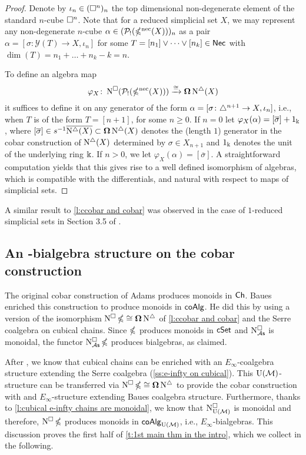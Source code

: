 \begin{proof}
	Denote by $\iota_n \in (\square^n)_n$ the top dimensional non-degenerate element of the standard $n$-cube $\square^n$.
	Note that for a reduced simplicial set $X$, we may represent any non-degenerate $n$-cube $\alpha \in (\mathcal{P}_!(\operatorname{\mathbb{\Omega}^{\mathrm{nec}}}(X)))_n$ as a pair $\alpha = [\sigma \colon \mathcal{Y}(T) \to X, \iota_n]$ for some $T = [n_1] \vee \dots \vee [n_k] \in \mathsf{Nec}$ with $\dim(T) = n_1 + \dots + n_k - k = n$.

	To define an algebra map
	\[
	\varphi_X \colon \operatorname{N^{\square}}(\mathcal{P}_!(\operatorname{\mathbb{\Omega}^{\mathrm{nec}}}(X))) \xrightarrow{\cong} \operatorname{\mathbf{\Omega}} \operatorname{N^{\triangle}}(X)
	\]
	it suffices to define it on any generator of the form $\alpha=[\sigma \colon \triangle^{n+1} \to X, \iota_{n}]$, i.e., when $T$ is of the form $T = [n+1]$, for some $n \geq 0$.
	If $n = 0$ let $\varphi_X(\alpha)= [\overline{\sigma}] + 1_\Bbbk$, where $[\overline{\sigma}] \in s^{-1} \overline{ \operatorname{N^{\triangle}}(X)} \subset \operatorname{\mathbf{\Omega}} \operatorname{N^{\triangle}}(X)$ denotes the (length $1$) generator in the cobar construction of $\operatorname{N^{\triangle}}(X)$ determined by $\sigma \in X_{n+1}$ and $1_\Bbbk$ denotes the unit of the underlying ring $\Bbbk$.
	If $n > 0$, we let $\varphi_X(\alpha)=[\overline{\sigma}]$.
	A straightforward computation yields that this gives rise to a well defined isomorphism of algebras, which is compatible with the differentials, and natural with respect to maps of simplicial sets.
\end{proof}
A similar result to \cref{l:ccobar and cobar} was observed in the case of $1$-reduced simplicial sets in Section 3.5 of \cite{berger1995loops}.

\subsection{An \pdfEinfty-bialgebra structure on the cobar construction} \label{ss:e-infty on cobar}

The original cobar construction of Adams produces monoids in $\mathsf{Ch}$.
Baues enriched this construction to produce monoids in $\mathsf{coAlg}$.
He did this by using a version of the isomorphism $\operatorname{N^{\square}} \operatorname{\mathbb{\Omega}} \cong \operatorname{\mathbf{\Omega}} \operatorname{N^{\triangle}}$ of \cref{l:ccobar and cobar} and the Serre coalgebra on cubical chains.
Since $\operatorname{\mathbb{\Omega}}$ produces monoids in $\mathsf{cSet}$ and $\operatorname{N^{\square}_{{\mathcal{A}\mathsf{s}}}}$ is monoidal, the functor $\operatorname{N^{\square}_{{\mathcal{A}\mathsf{s}}}} \operatorname{\mathbb{\Omega}}$ produces bialgebras, as claimed.

After \cite{medina2021cubical}, we know that cubical chains can be enriched with an $E_\infty$-coalgebra structure extending the Serre coalgebra (\cref{ss:e-infty on cubical}).
This ${\operatorname{U}(\mathcal{M})}$-structure can be transferred via $\operatorname{N^{\square}} \operatorname{\mathbb{\Omega}} \cong \operatorname{\mathbf{\Omega}} \operatorname{N^{\triangle}}$ to provide the cobar construction with and $E_\infty$-structure extending Baues coalgebra structure.
Furthermore, thanks to \cref{l:cubical e-infty chains are monoidal}, we know that $\operatorname{N^{\square}_{{\operatorname{U}(\mathcal{M})}}}$ is monoidal and therefore, $\operatorname{N^{\square}} \operatorname{\mathbb{\Omega}}$ produces monoids in $\mathsf{coAlg}_{{\operatorname{U}(\mathcal{M})}}$, i.e., $E_\infty$-bialgebras.
This discussion proves the first half of \cref{t:1st main thm in the intro}, which we collect in the following.

